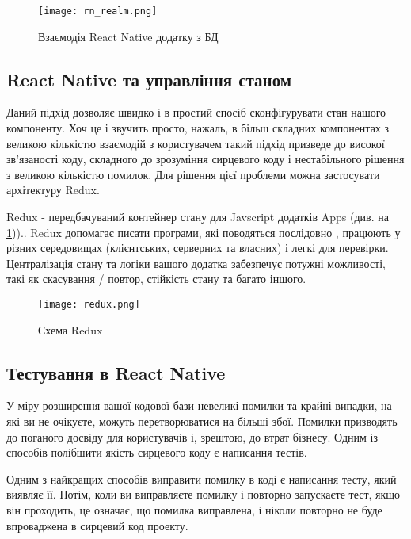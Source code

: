 \begin{figure}
    \begin{center}
        \texttt{[image: rn\_realm.png]}
    \end{center}
    \caption{Взаємодія React Native додатку з БД}
    \label{fig:rn_realm}
\end{figure}

\subsection{React Native та управління станом}
\label{subsec:rn_state_management}

Даний підхід дозволяє швидко і в простий спосіб сконфігурувати стан нашого компоненту.
Хоч це і звучить просто, нажаль, в більш складних компонентах з великою кількістю взаємодій
з користувачем такий підхід призведе до високої зв'язаності коду,
складного до зрозуміння сирцевого коду і нестабільного рішення з великою кількістю помилок.
Для рішення цієї проблеми можна застосувати архітектуру Redux.

Redux - передбачуваний контейнер стану для Javscript додатків Apps (див. на \ref{fig:rn_realm}))..
Redux допомагає писати програми, які поводяться послідовно , працюють у різних середовищах
(клієнтських, серверних та власних) і легкі для перевірки. \cite{redux_home_page}
Централізація стану та логіки вашого додатка забезпечує потужні можливості, такі як скасування / повтор,
стійкість стану та багато іншого. \cite{redux_home_page}

\begin{center}
    \begin{figure}
        \texttt{[image: redux.png]}
        \caption{Схема Redux}
        \label{fig:rn_redux}
    \end{figure}
\end{center}

\subsection{Тестування в React Native}
\label{subsec:rn_testing}
У міру розширення вашої кодової бази невеликі помилки та крайні випадки, на які ви не очікуєте, можуть перетворюватися на більші збої.
Помилки призводять до поганого досвіду для користувачів і, зрештою, до втрат бізнесу.
Одним із способів полібшити якість сирцевого коду є написання тестів.

Одним з найкращих способів виправити помилку в коді є написання тесту, який виявляє її.
Потім, коли ви виправляєте помилку і повторно запускаєте тест, якщо він проходить, це означає, що помилка виправлена,
і ніколи повторно не буде впроваджена в сирцевий код проекту.

